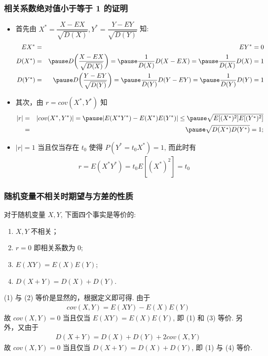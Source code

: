 \begin{frame}
	\frametitle{相关系数绝对值小于等于 1 的证明}
	\begin{itemize}[<+-|alert@+>]
		\item 首先由 $X^*=\dfrac{X-EX}{\sqrt{D (X)}}, Y^*=\dfrac{Y-EY}{\sqrt{D (Y)}}$ 知:
		\begin{eqnarray*}
			EX^*&=&EY^*=0\\
			D(X^*)&=&\pause D\bigg(\dfrac{X-EX}{\sqrt{D(X)}}\bigg)=\pause \dfrac{1}{D(X)}D(X-EX)=\pause \dfrac{1}{D(X)}D(X)=1\\
			D(Y^*)&=&\pause D\bigg(\dfrac{Y-EY}{\sqrt{D(Y)}}\bigg)=\pause \dfrac{1}{D(Y)}D(Y-EY)=\pause \dfrac{1}{D(Y)}D(Y)=1\\
		\end{eqnarray*}
		\item 其次，由 $r=cov (X^*,Y^*)$ 知
		\begin{eqnarray*}
			|r|&=&|cov(X^*,Y^*)|=\pause |E(X^*Y^*)-E(X^*)E(Y^*)|\le\pause  \sqrt{E[(X^*)^2]E[(Y^*)^2]}\\
			&=&\pause \sqrt{D(X^*)D(Y^*)}=1;
		\end{eqnarray*}
		\item $|r|=1$ 当且仅当存在 $t_0$ 使得 $P (Y^*=t_0X^*)=1$, 而此时有
		\begin{eqnarray*}
			r=E(X^*Y^*)=t_0E[(X^*)^2]=t_0
		\end{eqnarray*}
	\end{itemize}
\end{frame}
\begin{frame}
	\frametitle{随机变量不相关时期望与方差的性质}
	\begin{thm}
		对于随机变量 $X,Y$, 下面四个事实是等价的:
		\begin{enumerate}
			\item $X,Y$ 不相关；
			\item $r=0$ 即相关系数为 $0$;
			\item $E(XY)=E(X)E(Y)$;
			\item $D(X+Y)=D(X)+D(Y)$.
		\end{enumerate}
	\end{thm}

	\pause \zheng (1) 与 (2) 等价是显然的，根据定义即可得. \pause 由于
	\begin{eqnarray*}
		cov(X,Y)=E(XY)-E(X)E(Y)
	\end{eqnarray*}
	\pause 故 $cov (X,Y)=0$ 当且仅当 $E (XY)=E (X) E (Y)$, 即 (1) 和 (3) 等价. \pause 另外，又由于
	\begin{eqnarray*}
		D(X+Y)=D(X)+D(Y)+2cov(X,Y)
	\end{eqnarray*}
	故 $cov (X,Y)=0$ 当且仅当 $D (X+Y)=D (X)+D (Y)$, 即 (1) 与 (4) 等价.
\end{frame}
